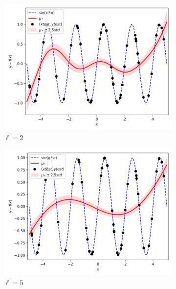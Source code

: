 \documentclass{article}
\begin{document}
\begin{figure}[h]
\begin{subfigure}{.33\textwidth}
    \includegraphics[width=\linewidth]{kernelSE/ell/2.png}
    \caption{$\ell = 2$}
    \label{fig:ell2}
  \end{subfigure}
  \begin{subfigure}{.33\textwidth}
    \centering
    \includegraphics[width=\linewidth]{kernelSE/ell/5.png}
    \caption{$\ell = 5$}
    \label{fig:ell5}
  \end{subfigure}
  \begin{subfigure}{.33\textwidth}
    \centering

\end{subfigure}
\end{figure}
\end{document}
